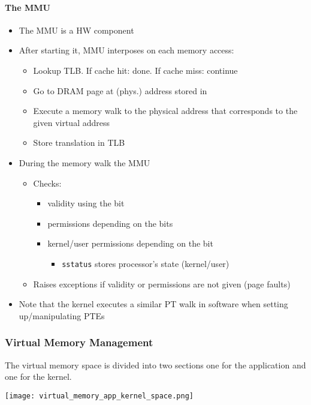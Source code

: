 \paragraph{The MMU}
\begin{itemize}
    \item The MMU is a HW component
    \item After starting it, MMU interposes on each memory access:
    \begin{itemize}
        \item Lookup TLB. If cache hit: done. If cache miss: continue
        \item Go to DRAM page at (phys.) address stored in 
        \item Execute a memory walk to the physical address that corresponds to the given virtual address
        \item Store translation in TLB
    \end{itemize}
    \item During the memory walk the MMU
    \begin{itemize}
        \item Checks:
        \begin{itemize}
            \item validity using the  bit
            \item permissions depending on the  bits
            \item kernel/user permissions depending on the  bit
            \begin{itemize}
                \item \texttt{sstatus} stores processor's state (kernel/user)
            \end{itemize}
        \end{itemize}
        \item Raises exceptions if validity or permissions are not given (page faults)
    \end{itemize}
    \item Note that the kernel executes a similar PT walk in software when setting up/manipulating PTEs
\end{itemize}

\subsubsection{Virtual Memory Management}
The virtual memory space is divided into two sections one for the application and one for the kernel.
\begin{center}
    \texttt{[image: virtual\_memory\_app\_kernel\_space.png]}
\end{center}

